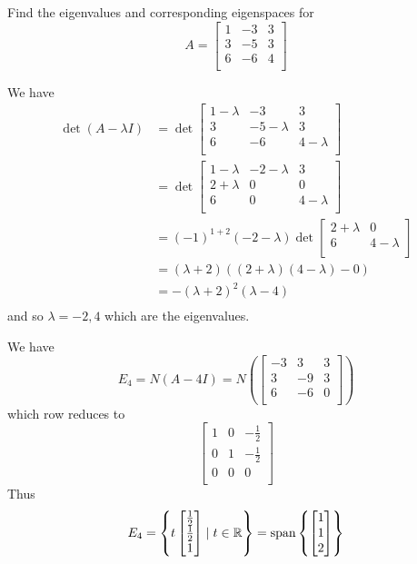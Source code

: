 \documentclass{article}
\DeclareMathOperator{\spn}{span}
\begin{document}
\begin{example}
  Find the eigenvalues and corresponding eigenspaces for \[
    A =
    \begin{bmatrix}
      1 & -3 & 3\\
      3 & -5 & 3\\
      6 & -6 & 4\\
    \end{bmatrix}
  \]

  We have
  \begin{align*}
    \det (A - \lambda I) &= \det
    \begin{bmatrix}
      1 - \lambda & -3 & 3\\
      3 & -5 - \lambda & 3\\
      6 & -6 & 4 - \lambda\\
    \end{bmatrix}\\
    &= \det
    \begin{bmatrix}
      1 - \lambda & -2 - \lambda & 3\\
      2 + \lambda & 0 & 0\\
      6 & 0 & 4 - \lambda\\
    \end{bmatrix}\\
    &= (-1)^{1 + 2}(-2 - \lambda)\det
    \begin{bmatrix}
      2 + \lambda & 0 \\
      6 & 4 - \lambda\\
    \end{bmatrix}\\
    &= (\lambda + 2)((2 + \lambda)(4- \lambda) - 0)\\
    &= -(\lambda + 2)^2(\lambda - 4)\\
  \end{align*} and so $\lambda = -2, 4$ which are the eigenvalues.

  We have \[
    E_4 = N(A - 4I) = N\left(
      \begin{bmatrix}
        -3 & 3 & 3\\
        3 & -9 & 3\\
        6 & -6 & 0\\
    \end{bmatrix}\right)
  \] which row reduces to \[
    \begin{bmatrix}
      1 & 0 & -\frac{1}{2}\\
      0 & 1 & -\frac{1}{2}\\
      0 & 0 & 0\\
    \end{bmatrix}
  \] Thus \[
    E_{4} = \left\{ t
      \begin{bmatrix}
        \frac{1}{2}\\\frac{1}{2}\\1\\
    \end{bmatrix}\mid t \in \R \right\} = \spn \left\{
      \begin{bmatrix}
        1\\1\\2\\
    \end{bmatrix}\right\}
  \]


\end{example}
\end{document}

